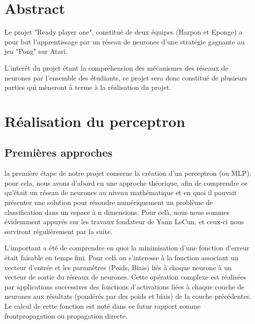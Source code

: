 \documentclass[
    10pt,
    a4paper,
    oneside,
    headinclude,footinclude,
    BCOR=5mm,
    captions=tableabove
]{scrartcl}
\title{\normalfont{\spacedallcaps{Ready-Player-One}}}
\subtitle{Rapport du groupe Harpon}
\author{Martin Lehoux, Pierre Biret \and Sacha Seksik, Loïc Audoin}
\date{\today}
\begin{document}
    
\renewcommand{\sectionmark}[1]{\markright{\spacedlowsmallcaps{#1}}}
\lehead{\mbox{\llap{\small\thepage\kern1em\color{halfgray} \vline}\color{halfgray}\hspace{0.5em}\rightmark\hfil}}
\pagestyle{scrheadings}

\maketitle

\section*{Abstract}
Le projet "Ready player one", constitué de deux équipes (Harpon et Eponge) a pour but l'apprentissage par un réseau de neurones d'une stratégie gagnante au jeu "Pong" sur Atari.

L'interêt du projet étant la compréhension des mécanismes des réseaux de neurones par l'ensemble des étudiants, ce projet sera donc constitué de plusieurs parties qui mèneront à terme à la réalisation du projet.



\newpage
\section{Réalisation du perceptron}


\subsection{Premières approches}

la première étape de notre projet conserne la création d'un perceptron (ou MLP). pour cela, nous avons d'abord eu une approche théorique, afin de comprendre ce qu'était un réseau de neurones au niveau mathématique et en quoi il pouvait présenter une solution pour résoudre numériquement un problème de classification dans un espace à n dimensions. Pour celà, nous nous sommes évidemment appuyés sur les travaux fondateur de Yann LeCun, et ceux-ci nous serviront régulièrement par la suite. 

L'important a été de comprendre en quoi la minimisation d'une fonction d'erreur était faisable en temps fini. Pour celà on s'interesse à la fonction associant un vecteur d'entrée et les paramètres (Poids, Biais) liés à chaque neurone à un vecteur de sortie du réseaux de neurones. Cette opération complexe est réalisées par applications successives des fonctions d'activations liées à chaque couche de neurones aux résultats (pondérés par des poids et biais) de la couche précédentes. 
Le calcul de cette fonction est noté dans ce futur rapport comme frontpropagation ou propagation directe.
\end{document}
